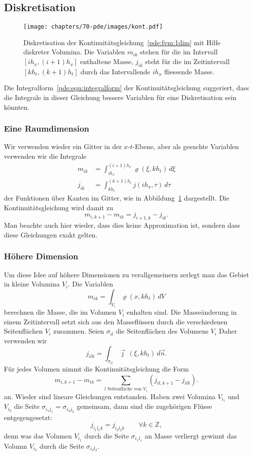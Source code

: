 \subsection{Diskretisation}
\begin{figure}
\centering
\texttt{[image: chapters/70-pde/images/kont.pdf]}
\caption{Diskretisation der Kontinuitätsgleichung~\eqref{pde:fvm:1dim}
mit Hilfe diskreter Volumina. 
Die Variablen $m_{ik}$ stehen für die im Intervall $[ih_x,(i+1)h_x]$
enthaltene Masse, $j_{ik}$ steht für die im Zeitintervall $[kh_t,(k+1)h_t]$
durch das Intervallende $ih_x$ fliessende Masse.
\label{buch:pde:fvdisk}}
\end{figure}
Die Integralform~\eqref{pde:eqn:integralform}
der Kontinuitätsgleichung suggeriert, dass die Integrale
in dieser Gleichung bessere Variablen für eine Diskretisation
sein könnten.

\subsubsection{Eine Raumdimension}
Wir verwenden wieder ein Gitter in der $x$-$t$-Ebene, aber 
als gesuchte Variablen verwenden wir die Integrale
\begin{align*}
m_{ik}
&=
\int_{ih_x}^{(i+1)h_x} \varrho(\xi,kh_t)\,d\xi
\\
j_{ik}
&=
\int_{kh_t}^{(k+1)h_t} j(ih_x,\tau) \,d\tau
\end{align*}
der Funktionen über Kanten im Gitter, wie in Abbildung~\ref{buch:pde:fvdisk}
dargestellt.
Die Kontinuitätsgleichung wird damit zu
\begin{equation}
m_{i,k+1}-m_{ik}
=
j_{i+1,k}-j_{ik}.
\label{pde:fvm:1dim}
\end{equation}
Man beachte auch hier wieder, dass dies keine Approximation ist, sondern
dass diese Gleichungen exakt gelten.

\subsubsection{Höhere Dimension}
Um diese Idee auf höhere Dimensionen zu verallgemeinern zerlegt man
das Gebiet in kleine Volumina $V_i$.
Die Variablen
\[
m_{ik} = \int_{V_i} \varrho(x, kh_t)\, dV
\]
berechnen die Masse, die im Volumen $V_i$ enhalten sind.
Die Masseänderung in einem Zeitintervall setzt sich aus den
Masseflüssen durch die verschiedenen Seitenflächen $V_i$ 
zusammen.
Seien $\sigma_{il}$ die Seitenflächen des Volumens $V_i$
Daher verwenden wir 
\[
j_{ilk} = \int_{\sigma_{il}} \vec{\jmath}\,(\xi, kh_t)\,d\vec{n}.
\]
Für jedes Volumen nimmt die Kontinuitätsgleichung die Form
\begin{equation}
m_{i,k+1}-m_{ik}
=
\sum_{\text{$l$ Seitenfläche von $V_i$}} (j_{il,k+1}-j_{ilk}).
\label{pde:fvm:ndim}
\end{equation}
an.
Wieder sind lineare Gleichungen entstanden.
Haben zwei Volumina $V_{i_1}$ und $V_{i_2}$ die Seite
$\sigma_{i_1j_1}=\sigma_{i_2j_2}$ gemeinsam, dann sind die 
zugehörigen Flüsse entgegengesetzt:
\[
j_{i_1l_1k}=j_{i_2l_2k}
\qquad\forall k\in\mathbb Z,
\]
denn was das Volumen $V_{i_1}$ durch die Seite $\sigma_{i_1l_1}$ an
Masse verliergt gewinnt das Volumn $V_{i_2}$ durch die Seite
$\sigma_{i_2l_2}$.


